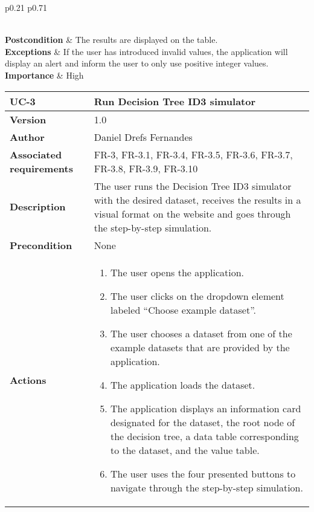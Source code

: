 \begin{table}[p]
\begin{tabularx}{\linewidth}{ p{0.21\columnwidth} p{0.71\columnwidth} }
\begin{enumerate}
		\end{enumerate}\\
		\textbf{Postcondition}        & The results are displayed on the table. \\
		\textbf{Exceptions}          & If the user has introduced invalid values, the application will display an alert and inform the user to only use positive integer values. \\
		\textbf{Importance}          & High \\
		\bottomrule
	\end{tabularx}
	\caption{UC-2 Run Conditional Entropy calculator.}
    \label{table:uc_2}
\end{table}

\begin{table}[p]
	\centering
	\begin{tabularx}{\linewidth}{ p{} p{} }
		\toprule
		\textbf{UC-3}    & \textbf{Run Decision Tree ID3 simulator}\\
		\toprule
		\textbf{Version}              & 1.0    \\
		\textbf{Author}                & Daniel Drefs Fernandes \\
		\textbf{Associated requirements} & FR-3, FR-3.1, FR-3.4, FR-3.5, FR-3.6, FR-3.7, FR-3.8, FR-3.9, FR-3.10 \\
		\textbf{Description}          & The user runs the Decision Tree ID3 simulator with the desired dataset, receives the results in a visual format on the website and goes through the step-by-step simulation. \\
		\textbf{Precondition}         & None \\
		\textbf{Actions}             &
		\begin{enumerate}
			\def\labelenumi{\arabic{enumi}.}
			\tightlist
			\item The user opens the application.
			\item The user clicks on the dropdown element labeled ``Choose example dataset''. 
            \item The user chooses a dataset from one of the example datasets that are provided by the application.
            \item The application loads the dataset.
            \item The application displays an information card designated for the dataset, the root node of the decision tree, a data table corresponding to the dataset, and the value table.
            \item The user uses the four presented buttons to navigate through the step-by-step simulation.

\end{enumerate}
\end{tabularx}
\end{table}
